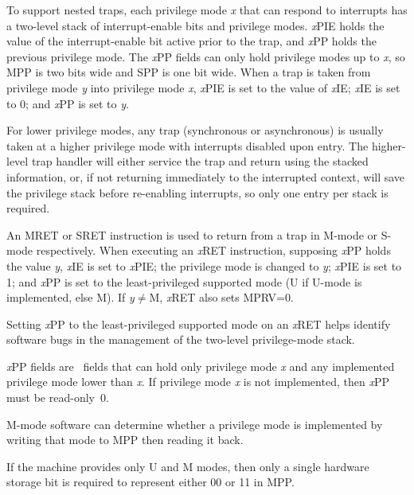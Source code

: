 To support nested traps, each privilege mode {\em x} that can respond to
interrupts has a two-level
stack of interrupt-enable bits and privilege modes.  {\em x}\/PIE
holds the value of the interrupt-enable bit active prior to the trap,
and {\em x}\/PP holds the previous privilege mode.  The {\em x}\/PP
fields can only hold privilege modes up to {\em x}, so MPP is
two bits wide and SPP is one bit wide.  When
a trap is taken from privilege mode {\em y} into privilege mode {\em
  x}, {\em x}\/PIE is set to the value of {\em x}\/IE; {\em x}\/IE is set to
0; and {\em x}\/PP is set to {\em y}.

\begin{commentary}
For lower privilege modes, any trap (synchronous or asynchronous) is
usually taken at a higher privilege mode with interrupts disabled upon entry.
The higher-level trap handler will either service the trap and return
using the stacked information, or, if not returning immediately to the
interrupted context, will save the privilege stack before re-enabling
interrupts, so only one entry per stack is required.
\end{commentary}

An MRET or SRET instruction is used to return from
a trap in M-mode or S-mode respectively.  When
executing an {\em x}\/RET instruction, supposing {\em x}\/PP holds the
value {\em y}, {\em x}\/IE is set to {\em x}\/PIE; the privilege mode
is changed to {\em y}; {\em x}\/PIE is set to 1; and {\em x}\/PP is
set to the least-privileged supported mode (U if U-mode is implemented, else M).
If {\em y}$\neq$M, {\em x}\/RET also sets MPRV=0.

\begin{commentary}
Setting {\em x}\/PP to the least-privileged supported mode on an {\em x}\/RET
helps identify software bugs in the management of the two-level privilege-mode
stack.
\end{commentary}

{\em x}\/PP fields are \warl\ fields that can hold only privilege mode {\em x}
and any implemented privilege mode lower than {\em x}.  If privilege mode {\em
x} is not implemented, then {\em x}\/PP must be read-only~0.

\begin{commentary}
M-mode software can determine whether a privilege mode is implemented
by writing that mode to MPP then reading it back.

If the machine provides only U and M modes, then only a single
hardware storage bit is required to represent either 00 or 11 in MPP.
\end{commentary}

